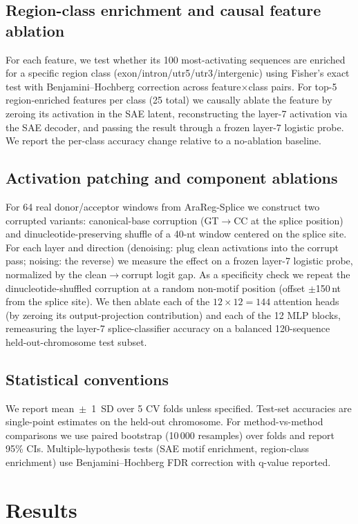 \documentclass[11pt, a4paper]{article}
\begin{document}
\subsection*{Region-class enrichment and causal feature ablation}
For each feature, we test whether its 100 most-activating sequences are
enriched for a specific region class (exon/intron/utr5/utr3/intergenic)
using Fisher's exact test with Benjamini--Hochberg correction across
feature$\times$class pairs. For top-5 region-enriched features per class
(25 total) we causally ablate the feature by zeroing its activation in the
SAE latent, reconstructing the layer-7 activation via the SAE decoder, and
passing the result through a frozen layer-7 logistic probe. We report the
per-class accuracy change relative to a no-ablation baseline.

\subsection*{Activation patching and component ablations}
For 64 real donor/acceptor windows from AraReg-Splice we construct two
corrupted variants: canonical-base corruption (GT$\rightarrow$CC at the
splice position) and dinucleotide-preserving shuffle of a 40-nt window
centered on the splice site. For each layer and direction (denoising:
plug clean activations into the corrupt pass; noising: the reverse) we
measure the effect on a frozen layer-7 logistic probe, normalized by the
clean$\to$corrupt logit gap. As a specificity check we repeat the
dinucleotide-shuffled corruption at a random non-motif position
(offset $\pm$150\,nt from the splice site). We then ablate each of the
$12 \times 12 = 144$ attention heads (by zeroing its output-projection
contribution) and each of the 12 MLP blocks, remeasuring the layer-7
splice-classifier accuracy on a balanced 120-sequence held-out-chromosome
test subset.

\subsection*{Statistical conventions}
We report mean~$\pm$~1~SD over 5 CV folds unless specified. Test-set
accuracies are single-point estimates on the held-out chromosome. For
method-vs-method comparisons we use paired bootstrap (10\,000 resamples)
over folds and report 95\% CIs. Multiple-hypothesis tests (SAE motif
enrichment, region-class enrichment) use Benjamini--Hochberg FDR
correction with q-value reported.

\section*{Results}
\label{sec:results}
\end{document}
